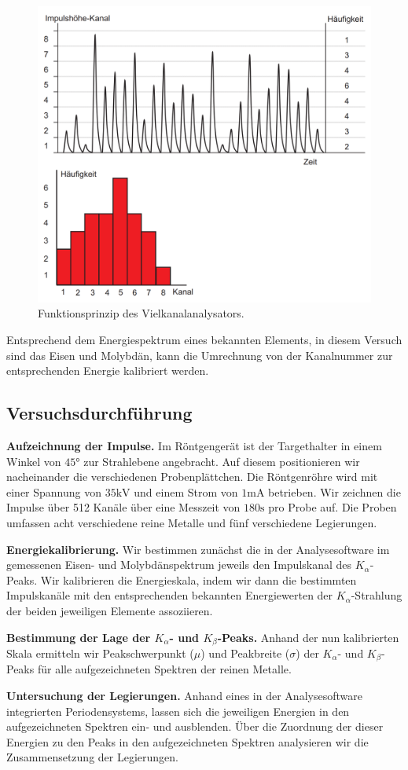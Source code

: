 \begin{figure}[H]
  \centering
  \includegraphics[width=.9\textwidth]{files/vielkanalanalysator.png}
  \caption{Funktionsprinzip des Vielkanalanalysators.}
  \label{fig:vielkanalanalysator}
\end{figure}

Entsprechend dem Energiespektrum eines bekannten Elements, in diesem Versuch sind das Eisen und Molybdän, kann die Umrechnung von der Kanalnummer zur entsprechenden Energie kalibriert werden.

\subsection{Versuchsdurchführung}

\textbf{Aufzeichnung der Impulse.} Im Röntgengerät ist der Targethalter in einem Winkel von $45\si{\degree}$ zur Strahlebene angebracht. Auf diesem positionieren wir nacheinander die verschiedenen Probenplättchen. Die Röntgenröhre wird mit einer Spannung von $35\si{\kilo\volt}$ und einem Strom von $1\si{\milli\ampere}$ betrieben. Wir zeichnen die Impulse über 512 Kanäle über eine Messzeit von $180\si{\second}$ pro Probe auf. Die Proben umfassen acht verschiedene reine Metalle und fünf verschiedene Legierungen.

\textbf{Energiekalibrierung.} Wir bestimmen zunächst die in der Analysesoftware im gemessenen Eisen- und Molybdänspektrum jeweils den Impulskanal des $K_{\alpha}$-Peaks. Wir kalibrieren die Energieskala, indem wir dann die bestimmten Impulskanäle mit den entsprechenden bekannten Energiewerten der $K_{\alpha}$-Strahlung der beiden jeweiligen Elemente assoziieren.

\textbf{Bestimmung der Lage der $K_{\alpha}$- und $K_{\beta}$-Peaks.} Anhand der nun kalibrierten Skala ermitteln wir Peakschwerpunkt ($\mu$) und Peakbreite ($\sigma$) der $K_{\alpha}$- und $K_{\beta}$-Peaks für alle aufgezeichneten Spektren der reinen Metalle.

\textbf{Untersuchung der Legierungen.} Anhand eines in der Analysesoftware integrierten Periodensystems, lassen sich die jeweiligen Energien in den aufgezeichneten Spektren ein- und ausblenden. Über die Zuordnung der dieser Energien zu den Peaks in den aufgezeichneten Spektren analysieren wir die Zusammensetzung der Legierungen.